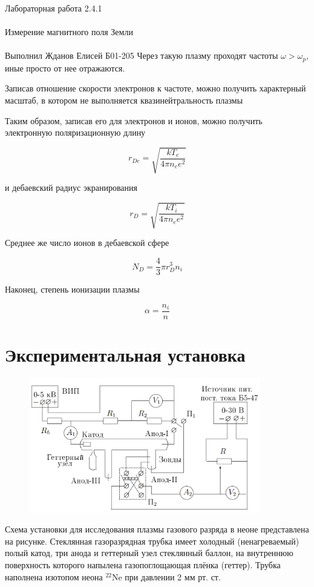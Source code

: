 \documentclass{astroedu-lab}
\begin{document}
\begin{problem}{\huge Лабораторная работа 2.4.1\\\\Измерение магнитного поля Земли\\\\Выполнил Жданов Елисей Б01-205}
Через такую плазму проходят частоты $\omega > \omega_p$, иные просто от нее отражаются.

Записав отношение скорости электронов к частоте, можно получить характерный масштаб, в котором не выполняется квазинейтральность плазмы

Таким образом, записав его для электронов и ионов, можно получить электронную поляризационную длину

\begin{equation}
	r_{De} = \sqrt{\frac{k T_e}{4 \pi n_e e^2}}
\end{equation}

и дебаевский радиус экранирования

\begin{equation}
	r_D = \sqrt{\frac{k T_i}{4 \pi n_e e^2}}
\end{equation}

Среднее же число ионов в дебаевской сфере

\begin{equation}
	N_D = \frac{4}{3} \pi r_D^3 n_i
\end{equation}

Наконец, степень ионизации плазмы

\begin{equation}
	\alpha = \frac{n_i}{n}
\end{equation}

\section{Экспериментальная установка}

\begin{figure}[!h]
	\centering
	\includegraphics[width=0.9\textwidth]{установка.png}
	\label{fig:boiler}
\end{figure}

Схема установки для исследования плазмы газового разряда в неоне представлена на рисунке. Стеклянная газоразрядная трубка
имеет холодный (ненагреваемый) полый катод, три анода и геттерный узел стеклянный баллон, на внутреннюю поверхность которого напылена газопоглощающая плёнка (геттер). Трубка наполнена изотопом неона $^{22}$Ne при давлении 2 мм рт. ст.


\end{problem}
\end{document}
